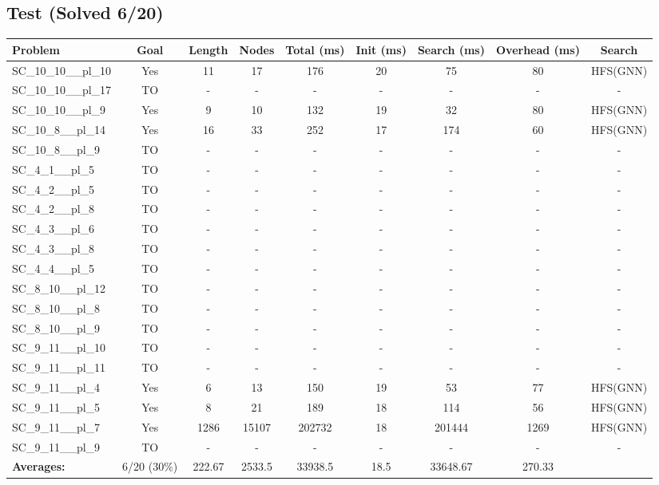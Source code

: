\documentclass{article}
\begin{document}
\subsection*{Test (Solved 6/20)}
\begin{tabular}{lcccccccc}
\toprule
Problem & Goal & Length & Nodes & Total (ms) & Init (ms) & Search (ms) & Overhead (ms) & Search \\
\midrule
SC\_10\_10\_\_pl\_10 & Yes & 11 & 17 & 176 & 20 & 75 & 80 & HFS(GNN) \\
SC\_10\_10\_\_pl\_17 & TO & - & - & - & - & - & - & - \\
SC\_10\_10\_\_pl\_9 & Yes & 9 & 10 & 132 & 19 & 32 & 80 & HFS(GNN) \\
SC\_10\_8\_\_pl\_14 & Yes & 16 & 33 & 252 & 17 & 174 & 60 & HFS(GNN) \\
SC\_10\_8\_\_pl\_9 & TO & - & - & - & - & - & - & - \\
SC\_4\_1\_\_pl\_5 & TO & - & - & - & - & - & - & - \\
SC\_4\_2\_\_pl\_5 & TO & - & - & - & - & - & - & - \\
SC\_4\_2\_\_pl\_8 & TO & - & - & - & - & - & - & - \\
SC\_4\_3\_\_pl\_6 & TO & - & - & - & - & - & - & - \\
SC\_4\_3\_\_pl\_8 & TO & - & - & - & - & - & - & - \\
SC\_4\_4\_\_pl\_5 & TO & - & - & - & - & - & - & - \\
SC\_8\_10\_\_pl\_12 & TO & - & - & - & - & - & - & - \\
SC\_8\_10\_\_pl\_8 & TO & - & - & - & - & - & - & - \\
SC\_8\_10\_\_pl\_9 & TO & - & - & - & - & - & - & - \\
SC\_9\_11\_\_pl\_10 & TO & - & - & - & - & - & - & - \\
SC\_9\_11\_\_pl\_11 & TO & - & - & - & - & - & - & - \\
SC\_9\_11\_\_pl\_4 & Yes & 6 & 13 & 150 & 19 & 53 & 77 & HFS(GNN) \\
SC\_9\_11\_\_pl\_5 & Yes & 8 & 21 & 189 & 18 & 114 & 56 & HFS(GNN) \\
SC\_9\_11\_\_pl\_7 & Yes & 1286 & 15107 & 202732 & 18 & 201444 & 1269 & HFS(GNN) \\
SC\_9\_11\_\_pl\_9 & TO & - & - & - & - & - & - & - \\
\textbf{Averages:} & 6/20 (30\%) & 222.67 & 2533.5 & 33938.5 & 18.5 & 33648.67 & 270.33 & \\
\bottomrule
\end{tabular}
\\[0.7cm]
\end{document}
